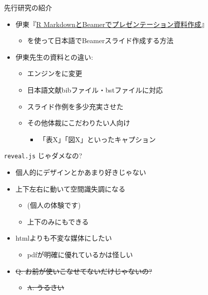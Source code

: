 \documentclass[
  12pt,
  ignorenonframetext,
]{beamer}
\providecommand{\tightlist}{%
  \setlength{\itemsep}{0pt}\setlength{\parskip}{0pt}}
\begin{document}
\begin{frame}{先行研究の紹介}
\protect\hypertarget{ux5148ux884cux7814ux7a76ux306eux7d39ux4ecb}{}

\begin{itemize}
\tightlist
\item
  伊東『\href{https://www.slideshare.net/hirokito/r-markdownbeamer-88777082}{R
  MarkdownとBeamerでプレゼンテーション資料作成}』

  \begin{itemize}
  \tightlist
  \item
    \LuaLaTeX を使って日本語でBeamerスライド作成する方法
  \end{itemize}
\item
  伊東先生の資料との違い:

  \begin{itemize}
  \tightlist
  \item
    エンジンを\XeLaTeX に変更
  \item
    日本語文献bibファイル・bstファイルに対応
  \item
    スライド作例を多少充実させた
  \item
    その他体裁にこだわりたい人向け

    \begin{itemize}
    \tightlist
    \item
      「表X」「図X」といったキャプション
    \end{itemize}
  \end{itemize}
\end{itemize}

\end{frame}

\begin{frame}{\texttt{reveal.js} じゃダメなの?}
\protect\hypertarget{reveal.js-ux3058ux3083ux30c0ux30e1ux306aux306e}{}

\begin{itemize}
\tightlist
\item
  個人的にデザインとかあまり好きじゃない
\item
  上下左右に動いて空間識失調になる

  \begin{itemize}
  \tightlist
  \item
    (個人の体験です)
  \item
    上下のみにもできる
  \end{itemize}
\item
  htmlよりも不変な媒体にしたい

  \begin{itemize}
  \tightlist
  \item
    pdfが明確に優れているかは怪しい
  \end{itemize}
\item
  \sout{Q: お前が使いこなせてないだけじゃないの?}

  \begin{itemize}
  \tightlist
  \item
    \sout{A: うるさい}
  \end{itemize}
\end{itemize}

\end{frame}
\end{document}
